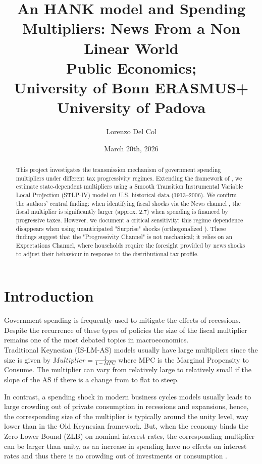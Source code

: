 \documentclass[12pt,letterpaper]{article}
\begin{document}
\title{\textbf{An HANK model and Spending Multipliers: News From a Non Linear World}\\{\small \textbf{Public Economics; \\ University of Bonn ERASMUS+  University of Padova}}}
\author{Lorenzo Del Col}
\date{March 20th, 2026}
\maketitle


\begin{abstract}
This project investigates the transmission mechanism of government spending multipliers under different tax progressivity regimes. Extending the framework of \cite{FN}, we estimate state-dependent multipliers using a Smooth Transition Instrumental Variable Local Projection (STLP-IV) model on U.S. historical data (1913–2006). We confirm the authors' central finding: when identifying fiscal shocks via the News channel \cite{RameyZubairy2018}, the fiscal multiplier is significantly larger (approx. 2.7) when spending is financed by progressive taxes. However, we document a critical sensitivity: this regime dependence disappears when using unanticipated "Surprise" shocks (orthogonalized \cite{BP}). These findings suggest that the "Progressivity Channel" is not mechanical; it relies on an Expectations Channel, where households require the foresight provided by news shocks to adjust their behaviour in response to the distributional tax profile.

\end{abstract}


\section{Introduction}
Government spending is frequently used to mitigate the effects of recessions. Despite the recurrence of these types of policies the size of the fiscal multiplier remains one of the most debated topics in macroeconomics.
\\
Traditional Keynesian (IS-LM-AS) models usually have large multipliers since the size is given by $Multiplier = \frac{1}{1 - MPC}$ where MPC is the Marginal Propensity to Consume. The multiplier can vary from relatively large to relatively small if the slope of the AS if there is a change from to flat to steep.

In contrast, a spending shock in modern business cycles models usually leads to large crowding out of private consumption in recessions and expansions, hence, the corresponding size of the multiplier is typically around the unity level, way lower than in the Old Keynesian framework. But, when the economy binds the Zero Lower Bound (ZLB) on nominal interest rates, the corresponding multiplier can be larger than unity, as an increase in spending have no effects on interest rates and thus there is no crowding out of investments or consumption \cite{Auerbach_Gorodnichenko_2012_Measuring}.
\end{document}
